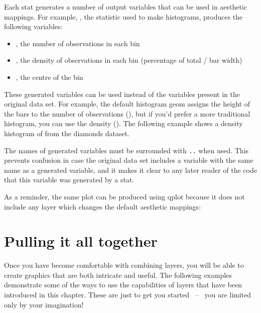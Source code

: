 Each stat generates a number of output variables that can be used in aesthetic mappings.  For example, , the statistic used to make histograms, produces the following variables:

\begin{itemize}
  \item {}, the number of observations in each bin
  \item {}, the density of observations in each bin (percentage of total / bar width)
  \item {}, the centre of the bin
\end{itemize}

These generated variables can be used instead of the variables present in the original data set.  For example, the default histogram geom assigns the height of the bars to the number of observations (), but if you'd prefer a more traditional histogram, you can use the density ().   The following example shows a density histogram of  from the diamonds dataset.

% 


The names of generated variables must be surrounded with {\tt ..} when used.  This prevents confusion in case the original data set includes a variable with the same name as a generated variable, and it makes it clear to any later reader of the code that this variable was generated by a stat.

As a reminder, the same plot can be produced using qplot because it does not include any layer which changes the default aesthetic mappings:

% 


\section{Pulling it all together}
\label{sec:pull-together}

Once you have become comfortable with combining layers, you will be able to create graphics that are both intricate and useful.  The following examples demonstrate some of the ways to use the capabilities of layers that have been introduced in this chapter.  These are just to get you started ~--~ you are limited only by your imagination!

